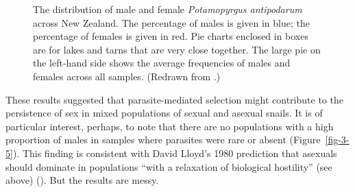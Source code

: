 \documentclass[
  letterpaper,
]{book}
\begin{document}
\begin{figure}


\caption[Distribution of male and female \emph{Potamopyrgus antipodarum}
across New Zealand]{\label{fig-3-6}The distribution of male and female
\emph{Potamopyrgus antipodarum} across New Zealand. The percentage of
males is given in blue; the percentage of females is given in red. Pie
charts enclosed in boxes are for lakes and tarns that are very close
together. The large pie on the left-hand side shows the average
frequencies of males and females across all samples. (Redrawn from
.)}

\end{figure}%

These results suggested that parasite-mediated selection might
contribute to the persistence of sex in mixed populations of sexual and
asexual snails. It is of particular interest, perhaps, to note that
there are no populations with a high proportion of males in samples
where parasites were rare or absent (Figure~\ref{fig-3-5}). This finding
is consistent with David Lloyd's 1980 prediction that asexuals should
dominate in populations ``with a relaxation of biological hostility''
(see above) (). But the results are
messy.
\end{document}
